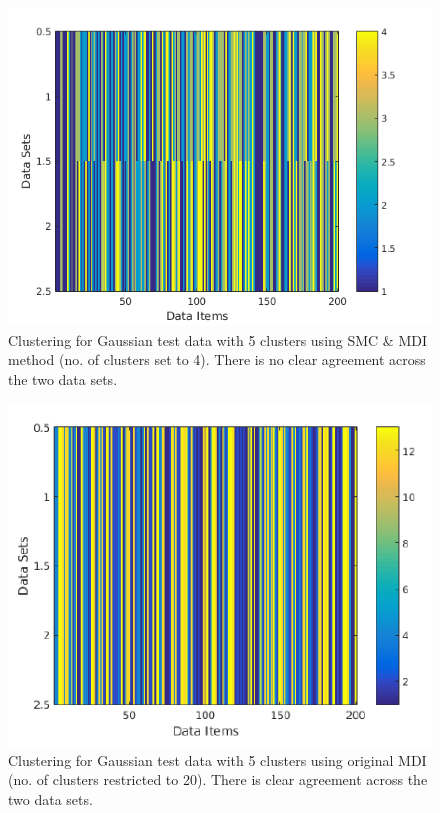 \documentclass[10pt,a4paper]{report}
\begin{document}
\begin{figure}
\includegraphics[width = \linewidth]{plots/cluster_mdismc_2.png}
\caption{Clustering for Gaussian test data with 5 clusters using SMC \& MDI method (no. of clusters set to 4). There is no clear agreement across the two data sets.}
\end{figure}


\begin{figure}
\includegraphics[width = \linewidth]{plots/cluster_mdi_2.png}
\caption{Clustering for Gaussian test data with 5 clusters using original MDI (no. of clusters restricted to 20). There is clear agreement across the two data sets.}
\end{figure}
\end{document}
